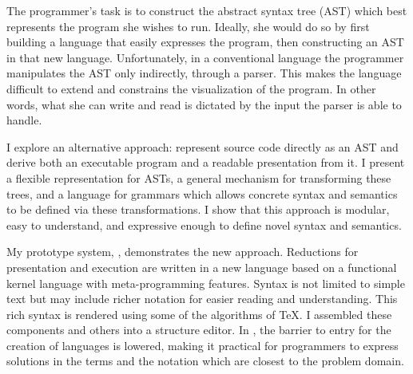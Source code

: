 The programmer's task is to construct the abstract syntax tree (AST) which best represents the program she wishes to run. Ideally, she would do so by first building a language that easily expresses the program, then constructing an AST in that new language. Unfortunately, in a conventional language the programmer manipulates the AST only indirectly, through a parser. This makes the language difficult to extend and constrains the visualization of the program. In other words, what she can write and read is dictated by the input the parser is able to handle.

I explore an alternative approach: represent source code directly as an AST and derive both an executable program and a readable presentation from it. I present a flexible representation for ASTs, a general mechanism for transforming these trees, and a language for grammars which allows concrete syntax and semantics to be defined via these transformations. I show that this approach is modular, easy to understand, and expressive enough to define novel syntax and semantics.

My prototype system, \Meta, demonstrates the new approach. Reductions for presentation and execution are written in a new language based on a functional kernel language with meta-programming features. Syntax is not limited to simple text but may include richer notation for easier reading and understanding. This rich syntax is rendered using some of the algorithms of \TeX. I assembled these components and others into a structure editor. In \Meta, the barrier to entry for the creation of languages is lowered, making it practical for programmers to express solutions in the terms and the notation which are closest to the problem domain.
